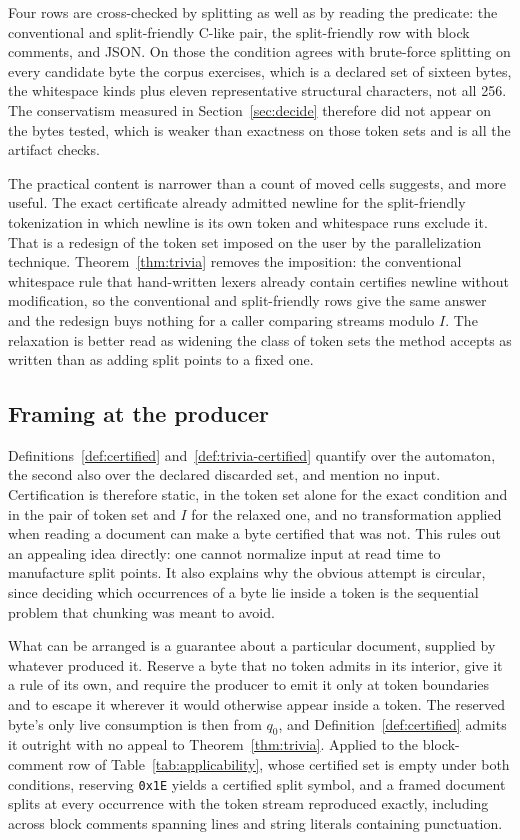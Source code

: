 \documentclass[11pt,a4paper]{article}
\theoremstyle{definition}
\theoremstyle{plain}
\newcommand{\code}[1]{\texttt{#1}}
\begin{document}
Four rows are cross-checked by splitting as well as by reading the predicate: the conventional and split-friendly
C-like pair, the split-friendly row with block comments, and JSON. On those the condition agrees with brute-force
splitting on every candidate byte the corpus exercises, which is a declared set of sixteen bytes, the whitespace kinds
plus eleven representative structural characters, not all 256. The conservatism measured in Section~\ref{sec:decide}
therefore did not appear on the bytes tested, which is weaker than exactness on those token sets and is all the
artifact checks.

The practical content is narrower than a count of moved cells suggests, and more useful. The exact certificate already
admitted newline for the split-friendly tokenization in which newline is its own token and whitespace runs exclude it.
That is a redesign of the token set imposed on the user by the parallelization technique. Theorem~\ref{thm:trivia}
removes the imposition: the conventional whitespace rule that hand-written lexers already contain certifies newline
without modification, so the conventional and split-friendly rows give the same answer and the redesign buys nothing
for a caller comparing streams modulo $I$. The relaxation is better read as widening the class of token sets the
method accepts as written than as adding split points to a fixed one.

\subsection{Framing at the producer}
\label{sec:framing}

Definitions~\ref{def:certified} and~\ref{def:trivia-certified} quantify over the automaton, the second also over the
declared discarded set, and mention no input. Certification is therefore static, in the token set alone for the exact
condition and in the pair of token set and $I$ for the relaxed one, and no transformation applied when reading a
document
can make a byte certified that was not. This rules out an appealing idea directly: one cannot normalize input at read
time to manufacture split points. It also explains why the obvious attempt is circular, since deciding which
occurrences of a byte lie inside a token is the sequential problem that chunking was meant to avoid.

What can be arranged is a guarantee about a particular document, supplied by whatever produced it. Reserve a byte that
no token admits in its interior, give it a rule of its own, and require the producer to emit it only at token
boundaries and to escape it wherever it would otherwise appear inside a token. The reserved byte's only live
consumption is then from $q_0$, and Definition~\ref{def:certified} admits it outright with no appeal to
Theorem~\ref{thm:trivia}.
Applied to the block-comment row of Table~\ref{tab:applicability}, whose certified set is empty under both conditions,
reserving \code{0x1E} yields a certified split symbol, and a framed document splits at every occurrence with the token
stream reproduced exactly, including across block comments spanning lines and string literals containing punctuation.
\end{document}
